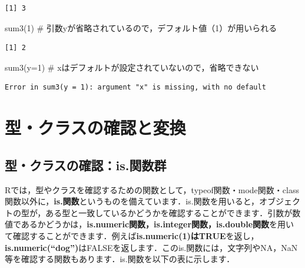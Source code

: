 \documentclass[
  letterpaper,
  DIV=11,
  numbers=noendperiod]{scrreprt}
\newenvironment{Shaded}{\begin{snugshade}}{\end{snugshade}}
\newcommand{\AttributeTok}[1]{\textcolor[rgb]{0.40,0.45,0.13}{#1}}
\newcommand{\CommentTok}[1]{\textcolor[rgb]{0.37,0.37,0.37}{#1}}
\newcommand{\DecValTok}[1]{\textcolor[rgb]{0.68,0.00,0.00}{#1}}
\newcommand{\FunctionTok}[1]{\textcolor[rgb]{0.28,0.35,0.67}{#1}}
\newcommand{\NormalTok}[1]{\textcolor[rgb]{0.00,0.23,0.31}{#1}}
\begin{document}
\begin{verbatim}
[1] 3
\end{verbatim}

\begin{Shaded}
\begin{Highlighting}[]
\FunctionTok{sum3}\NormalTok{(}\DecValTok{1}\NormalTok{) }\CommentTok{\# 引数yが省略されているので，デフォルト値（1）が用いられる}
\end{Highlighting}
\end{Shaded}

\begin{verbatim}
[1] 2
\end{verbatim}

\begin{Shaded}
\begin{Highlighting}[]
\FunctionTok{sum3}\NormalTok{(}\AttributeTok{y=}\DecValTok{1}\NormalTok{) }\CommentTok{\# xはデフォルトが設定されていないので，省略できない}
\end{Highlighting}
\end{Shaded}

\begin{verbatim}
Error in sum3(y = 1): argument "x" is missing, with no default
\end{verbatim}

\hypertarget{ux578bux30afux30e9ux30b9ux306eux78baux8a8dux3068ux5909ux63db}{%
\section{型・クラスの確認と変換}\label{ux578bux30afux30e9ux30b9ux306eux78baux8a8dux3068ux5909ux63db}}

\hypertarget{ux578bux30afux30e9ux30b9ux306eux78baux8a8dis.ux95a2ux6570ux7fa4}{%
\subsection{型・クラスの確認：is.関数群}\label{ux578bux30afux30e9ux30b9ux306eux78baux8a8dis.ux95a2ux6570ux7fa4}}

Rでは，型やクラスを確認するための関数として，typeof関数・mode関数・class関数以外に，\textbf{is.関数}というものを備えています．is.関数を用いると，オブジェクトの型が，ある型と一致しているかどうかを確認することができます．引数が数値であるかどうかは，\textbf{is.numeric関数，is.integer関数，is.double関数}を用いて確認することができます．例えば\textbf{is.numeric(1)はTRUE}を返し，\textbf{is.numeric(``dog'')}はFALSEを返します．このis.関数には，文字列やNA，NaN等を確認する関数もあります．is.関数を以下の表に示します．
\end{document}
